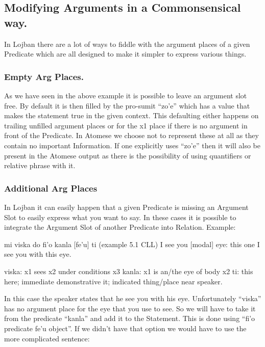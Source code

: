 \subsection{Modifying Arguments in a Commonsensical way.}

In Lojban there are a lot of ways to fiddle with the argument places of a given Predicate which are all designed to make it simpler to express various things.

\subsubsection{Empty Arg Places.}

As we have seen in the above example it is possible to leave an argument slot free. By default it is then filled by the pro-sumit “zo’e” which has a value that makes the statement true in the given context. This defaulting either happens on trailing unfilled argument places or for the x1 place if there is no argument in front of the Predicate.
In Atomese we choose not to represent these at all as they contain no important Information.
If one explicitly uses “zo’e” then it will also be present in the Atomese output as there is the possibility of using quantifiers or relative phrase with it.

\subsubsection{Additional Arg Places}

In Lojban it can easily happen that a given Predicate is missing an Argument Slot to easily express what you want to say. In these cases it is possible to integrate the Argument Slot of another Predicate into Relation. Example:

\begin{center}
mi viska do fi'o kanla [fe'u] ti (example 5.1 CLL)
       I see you [modal] eye: this one
       I see you with this eye.

viska: x1 sees x2 under conditions x3
kanla: x1 is an/the eye of body x2
ti: this here; immediate demonstrative it; indicated thing/place near speaker.
\end{center}

In this case the speaker states that he see you with his eye. Unfortunately “viska” has no argument place for the eye that you use to see. So we will have to take it from the predicate “kanla” and add it to the Statement. This is done using “fi’o predicate fe’u object”.
If we didn’t have that option we would have to use the more complicated sentence:

